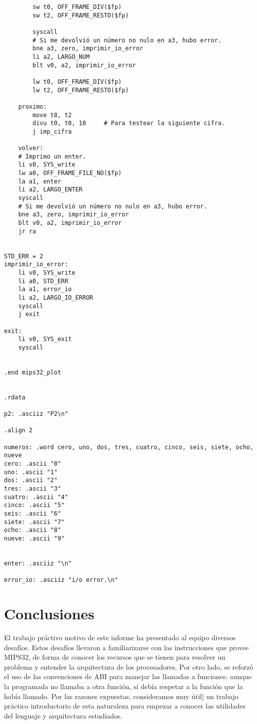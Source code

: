 \documentclass[a4paper,10pt]{article}
\begin{document}
\begin{verbatim}
		sw t0, OFF_FRAME_DIV($fp)
		sw t2, OFF_FRAME_RESTO($fp)
		
		syscall
		# Si me devolvió un número no nulo en a3, hubo error.
		bne a3, zero, imprimir_io_error
		li a2, LARGO_NUM
		blt v0, a2, imprimir_io_error
		
		lw t0, OFF_FRAME_DIV($fp)
		lw t2, OFF_FRAME_RESTO($fp)
		
	proximo:
		move t8, t2
		divu t0, t0, 10		# Para testear la siguiente cifra.
		j imp_cifra
	
	volver:
    # Imprimo un enter.
    li v0, SYS_write
	lw a0, OFF_FRAME_FILE_NO($fp)
	la a1, enter
	li a2, LARGO_ENTER
	syscall
	# Si me devolvió un número no nulo en a3, hubo error.
	bne a3, zero, imprimir_io_error
    blt v0, a2, imprimir_io_error
    jr ra


STD_ERR = 2		
imprimir_io_error:
	li v0, SYS_write
	li a0, STD_ERR
	la a1, error_io
	li a2, LARGO_IO_ERROR
	syscall
	j exit

exit:
	li v0, SYS_exit
	syscall


.end mips32_plot


.rdata

p2: .asciiz "P2\n"

.align 2

numeros: .word cero, uno, dos, tres, cuatro, cinco, seis, siete, ocho, nueve
cero: .ascii "0"
uno: .ascii "1"
dos: .ascii "2"
tres: .ascii "3"
cuatro: .ascii "4"
cinco: .ascii "5"
seis: .ascii "6"
siete: .ascii "7"
ocho: .ascii "8"
nueve: .ascii "9"


enter: .asciiz "\n"

error_io: .asciiz "i/o error.\n"\end{verbatim}

\pagebreak



\section{Conclusiones}
El trabajo pr\'activo motivo de este informe ha presentado al equipo diversos desaf\'ios. 
Estos  desaf\'ios llevaron a familiarizarse con las instrucciones que provee MIPS32, de forma 
de conocer los recursos que se tienen para resolver un problema y entender la arquitectura de 
los procesadores. Por otro lado, se reforz\'o el uso de las convenciones de ABI para manejar las 
llamadas a funciones; aunque la programada no llamaba a otra funci\'on, s\'i deb\'ia respetar a la 
funci\'on que la hab\'ia llamado.
Por las razones expuestas, consideramos muy \'util| un trabajo pr\'actico introductorio de esta 
naturaleza para empezar a conocer las utilidades del lenguaje y arquitectura estudiados.\\
\end{document}
